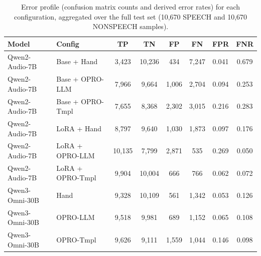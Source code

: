\begin{table}[t]
\centering
\caption{Error profile (confusion matrix counts and derived error rates) for each configuration, aggregated over the full test set (10{,}670 SPEECH and 10{,}670 NONSPEECH samples).}
\label{tab:error_counts}
\footnotesize
\setlength{\tabcolsep}{4pt}
\renewcommand{\arraystretch}{1.12}
\begin{tabular}{llcccccc}
\toprule
\textbf{Model} & \textbf{Config} & \textbf{TP} & \textbf{TN} & \textbf{FP} & \textbf{FN} & \textbf{FPR} & \textbf{FNR} \\
\midrule
Qwen2-Audio-7B & Base + Hand      &  3{,}423 & 10{,}236 &    434 & 7{,}247 & 0.041 & 0.679 \\
Qwen2-Audio-7B & Base + OPRO-LLM  &  7{,}966 &  9{,}664 & 1{,}006 & 2{,}704 & 0.094 & 0.253 \\
Qwen2-Audio-7B & Base + OPRO-Tmpl &  7{,}655 &  8{,}368 & 2{,}302 & 3{,}015 & 0.216 & 0.283 \\
\midrule
Qwen2-Audio-7B & LoRA + Hand      &  8{,}797 &  9{,}640 & 1{,}030 & 1{,}873 & 0.097 & 0.176 \\
Qwen2-Audio-7B & LoRA + OPRO-LLM  & 10{,}135 &  7{,}799 & 2{,}871 &    535 & 0.269 & 0.050 \\
Qwen2-Audio-7B & LoRA + OPRO-Tmpl &  9{,}904 & 10{,}004 &    666 &    766 & 0.062 & 0.072 \\
\midrule
Qwen3-Omni-30B & Hand      &  9{,}328 & 10{,}109 &    561 & 1{,}342 & 0.053 & 0.126 \\
Qwen3-Omni-30B & OPRO-LLM  &  9{,}518 &  9{,}981 &    689 & 1{,}152 & 0.065 & 0.108 \\
Qwen3-Omni-30B & OPRO-Tmpl &  9{,}626 &  9{,}111 & 1{,}559 & 1{,}044 & 0.146 & 0.098 \\
\bottomrule
\end{tabular}
\end{table}